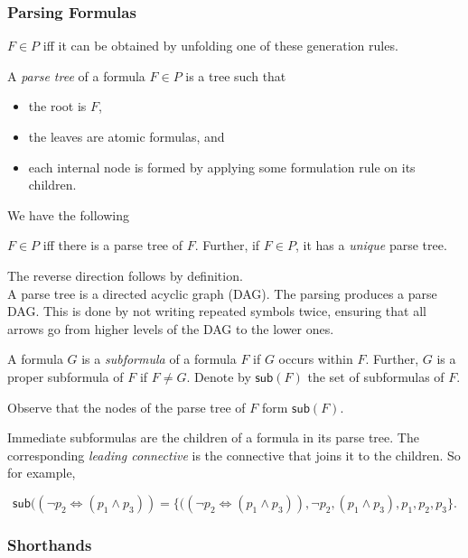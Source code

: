 \subsubsection{Parsing Formulas}

$F\in P$ iff it can be obtained by unfolding one of these generation rules.

\begin{definition}
A \textit{parse tree} of a formula $F\in P$ is a tree such that
\begin{itemize}
	\item the root is $F$,
	\item the leaves are atomic formulas, and
	\item each internal node is formed by applying some formulation rule on its children.
\end{itemize}
\end{definition}

We have the following 

\begin{theorem}
$F\in P$ iff there is a parse tree of $F$. Further, if $F\in P$, it has a \textit{unique} parse tree.
\end{theorem}
The reverse direction follows by definition.\\

A parse tree is a directed acyclic graph (DAG). The parsing produces a parse DAG. This is done by not writing repeated symbols twice, ensuring that all arrows go from higher levels of the DAG to the lower ones.

\begin{definition}
A formula $G$ is a \textit{subformula} of a formula $F$ if $G$ occurs within $F$. Further, $G$ is a proper subformula of $F$ if $F\neq G$. Denote by $\mathsf{sub}(F)$ the set of subformulas of $F$.
\end{definition}

Observe that the nodes of the parse tree of $F$ form $\mathsf{sub}(F)$.

Immediate subformulas are the children of a formula in its parse tree. The corresponding \textit{leading connective} is the connective that joins it to the children. So for example,

\[ \mathsf{sub}((\neg p_2 \iff (p_1 \wedge p_3)) = \{((\neg p_2 \iff (p_1 \wedge p_3)), \neg p_2, (p_1 \wedge p_3), p_1, p_2, p_3\}. \]

\subsubsection{Shorthands}

